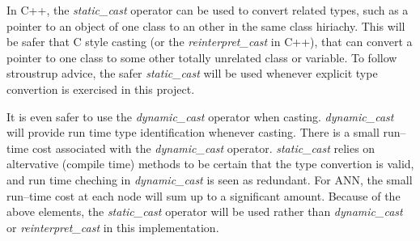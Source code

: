 	In C++, the \emph{static\_cast} operator can be used to convert related types, such as a pointer to an object of one class to an other in the same class hiriachy. 
	This will be safer that C style casting (or the \emph{reinterpret\_cast} in C++), that can convert a pointer to one class to some other totally unrelated class or variable.
	To follow stroustrup advice, %
	the safer \emph{static\_cast} will be used whenever explicit type convertion is exercised in this project.

	It is even safer to use the \emph{dynamic\_cast} operator when casting. \emph{dynamic\_cast} will provide run time type identification whenever casting. %
	There is a small run--time cost associated with the \emph{dynamic\_cast} operator. 
	\emph{static\_cast} relies on altervative (compile time) methods to be certain that the type convertion is valid, and run time cheching in \emph{dynamic\_cast} is seen as redundant.
	For ANN, the small run--time cost at each node will sum up to a significant amount.
	Because of the above elements, the \emph{static\_cast} operator will be used rather than \emph{dynamic\_cast} or \emph{reinterpret\_cast} in this implementation.





	






